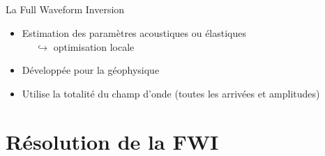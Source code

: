 \documentclass[10pt,xcolor=x11names,compress, notes=show]{beamer}%
\begin{document}
\subsection*{}
\begin{frame}{La Full Waveform Inversion}
	\begin{itemize}
		\item Estimation des paramètres acoustiques ou élastiques\\ $~~~~~~\hookrightarrow$ optimisation locale
		\item Développée pour la géophysique
		\item Utilise la totalité du champ d'onde (toutes les arrivées et amplitudes)
	\end{itemize}

\end{frame}

\subsection*{}
\begin{frame}{\insertsectionhead}
	\vspace{-0.5cm}
	\begin{figure}
		\centering
		
	\end{figure}		
	

\end{frame}
\section{Résolution de la FWI}
\end{document}
